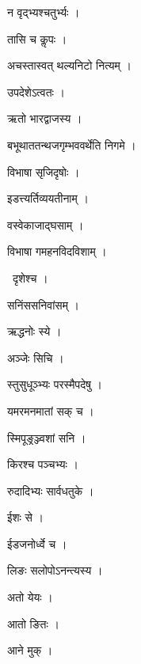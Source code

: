 \documentclass[10pt, openany, oneside]{book}
\begin{document}
\noindent न वृद्भ्यश्चतुर्भ्यः ।

\noindent तासि च कॢपः ।

\noindent अचस्तास्वत् थल्यनिटो नित्यम् ।

\noindent उपदेशेऽत्वतः ।

\noindent ऋतो भारद्वाजस्य ।

\noindent बभूथाततन्थजगृम्भववर्थेति निगमे ।

\noindent विभाषा सृजिदृषोः ।

\noindent इडत्त्यर्तिव्ययतीनाम् ।

\noindent वस्वेकाजाद्घसाम् ।

\noindent विभाषा गमहनविदविशाम् ।

\par\noindent\hspace{1.5em}{\vps वा॰}~{\qt दृशेश्च ।}

\noindent सनिंससनिवांसम् ।

\noindent ऋद्धनोः स्ये ।

\noindent अञ्जेः सिचि ।

\noindent स्तुसुधूञ्भ्यः परस्मैपदेषु ।

\noindent यमरमनमातां सक् च ।

\noindent स्मिपूङ्रञ्ज्वशां सनि ।

\noindent किरश्च पञ्चभ्यः ।

\noindent रुदादिभ्यः सार्वधतुके ।

\noindent ईशः से ।

\noindent ईडजनोर्ध्वे च ।

\noindent लिङः सलोपोऽनन्त्यस्य ।

\noindent अतो येयः ।

\noindent आतो ङितः ।

\noindent आने मुक् ।
\end{document}
